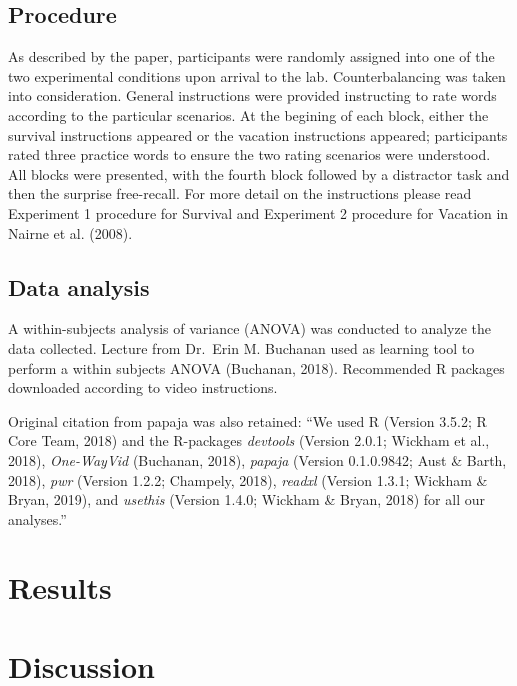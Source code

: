 \documentclass[man]{apa6}
\begin{document}
\hypertarget{procedure}{%
\subsection{Procedure}\label{procedure}}

As described by the paper, participants were randomly assigned into one of the two experimental conditions upon arrival to the lab. Counterbalancing was taken into consideration. General instructions were provided instructing to rate words according to the particular scenarios. At the begining of each block, either the survival instructions appeared or the vacation instructions appeared; participants rated three practice words to ensure the two rating scenarios were understood. All blocks were presented, with the fourth block followed by a distractor task and then the surprise free-recall. For more detail on the instructions please read Experiment 1 procedure for Survival and Experiment 2 procedure for Vacation in Nairne et al. (2008).

\hypertarget{data-analysis}{%
\subsection{Data analysis}\label{data-analysis}}

A within-subjects analysis of variance (ANOVA) was conducted to analyze the data collected. Lecture from Dr.~Erin M. Buchanan used as learning tool to perform a within subjects ANOVA (Buchanan, 2018). Recommended R packages downloaded according to video instructions.

Original citation from papaja was also retained: \enquote{We used R (Version 3.5.2; R Core Team, 2018) and the R-packages \emph{devtools} (Version 2.0.1; Wickham et al., 2018), \emph{One-WayVid} (Buchanan, 2018), \emph{papaja} (Version 0.1.0.9842; Aust \& Barth, 2018), \emph{pwr} (Version 1.2.2; Champely, 2018), \emph{readxl} (Version 1.3.1; Wickham \& Bryan, 2019), and \emph{usethis} (Version 1.4.0; Wickham \& Bryan, 2018) for all our analyses.}

\hypertarget{results}{%
\section{Results}\label{results}}

\hypertarget{discussion}{%
\section{Discussion}\label{discussion}}
\end{document}
